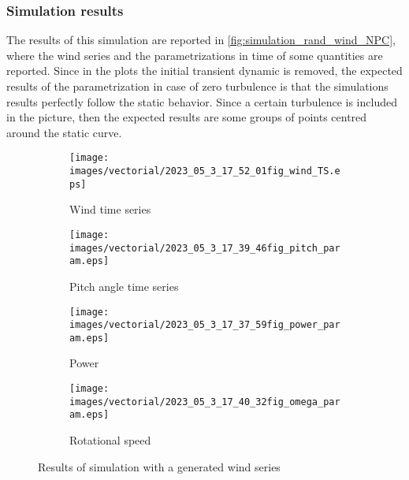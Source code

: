 \subsubsection{Simulation results}
The results of this simulation are reported in \autoref{fig:simulation_rand_wind_NPC}, where the wind series and the parametrizations in time of some quantities are reported. Since in the plots the initial transient dynamic is removed, the expected results of the parametrization in case of zero turbulence is that the simulations results perfectly follow the static behavior. Since a certain turbulence is included in the picture, then the expected results are some groups of points centred around the static curve.
\begin{figure}[htb]
  \begin{subfigure}{0.5\columnwidth}
    \centering
    \texttt{[image: images/vectorial/2023\_05\_3\_17\_52\_01fig\_wind\_TS.eps]}
    \caption{Wind time series}
    \label{fig:2023_05_1_00_55_48fig_wind_TS.eps}
  \end{subfigure}
  \begin{subfigure}{0.5\columnwidth}
    \centering
    \texttt{[image: images/vectorial/2023\_05\_3\_17\_39\_46fig\_pitch\_param.eps]}
    \caption{Pitch angle time series}
    \label{fig:2023_05_1_00_50_19fig_power_param}
  \end{subfigure}
  \begin{subfigure}{0.5\columnwidth}
    \centering
    \texttt{[image: images/vectorial/2023\_05\_3\_17\_37\_59fig\_power\_param.eps]}
    \caption{Power}
    \label{fig:2023_05_1_00_51_17fig_omega_param}
  \end{subfigure}
  \begin{subfigure}{0.5\columnwidth}
    \centering
    \texttt{[image: images/vectorial/2023\_05\_3\_17\_40\_32fig\_omega\_param.eps]}
    \caption{Rotational speed}
    \label{fig:2023_05_1_00_50_58fig_pitch_param}
  \end{subfigure}
  \caption{Results of simulation with a generated wind series}
  \label{fig:simulation_rand_wind_NPC}
\end{figure}

